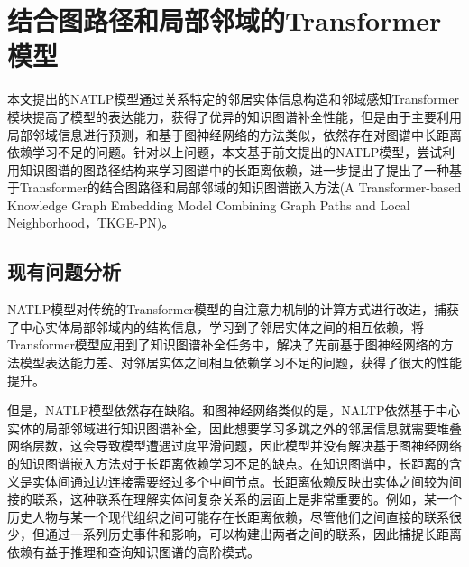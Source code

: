 \chapter{结合图路径和局部邻域的Transformer模型}


本文提出的NATLP模型通过关系特定的邻居实体信息构造和邻域感知Transformer模块提高了模型的表达能力，获得了优异的知识图谱补全性能，但是由于主要利用局部邻域信息进行预测，和基于图神经网络的方法类似，依然存在对图谱中长距离依赖学习不足的问题。针对以上问题，本文基于前文提出的NATLP模型，尝试利用知识图谱的图路径结构来学习图谱中的长距离依赖，进一步提出了提出了一种基于Transformer的结合图路径和局部邻域的知识图谱嵌入方法(A Transformer-based Knowledge Graph Embedding Model Combining Graph Paths and Local Neighborhood，TKGE-PN)。

\section{现有问题分析}
NATLP模型对传统的Transformer模型的自注意力机制的计算方式进行改进，捕获了中心实体局部邻域内的结构信息，学习到了邻居实体之间的相互依赖，将Transformer模型应用到了知识图谱补全任务中，解决了先前基于图神经网络的方法模型表达能力差、对邻居实体之间相互依赖学习不足的问题，获得了很大的性能提升。

但是，NATLP模型依然存在缺陷。和图神经网络类似的是，NALTP依然基于中心实体的局部邻域进行知识图谱补全，因此想要学习多跳之外的邻居信息就需要堆叠网络层数，这会导致模型遭遇过度平滑问题，因此模型并没有解决基于图神经网络的知识图谱嵌入方法对于长距离依赖学习不足的缺点。在知识图谱中，长距离的含义是实体间通过边连接需要经过多个中间节点。长距离依赖反映出实体之间较为间接的联系，这种联系在理解实体间复杂关系的层面上是非常重要的。例如，某一个历史人物与某一个现代组织之间可能存在长距离依赖，尽管他们之间直接的联系很少，但通过一系列历史事件和影响，可以构建出两者之间的联系，因此捕捉长距离依赖有益于推理和查询知识图谱的高阶模式。

